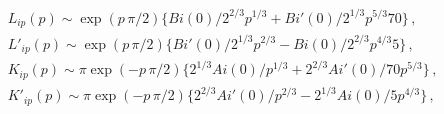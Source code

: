 \begin{equation}\label{app}\begin{array}{l} L_{ip}(p)\sim \exp(p\,\pi/2)\{Bi(0)/2^{2/3}p^{1/3}+Bi'(0)/2^{1/3}p^{5/3}70\}\,,\\
L'_{ip}(p)\sim
\exp(p\,\pi/2)\{Bi'(0)/2^{1/3}p^{2/3}-Bi(0)/2^{2/3}p^{4/3}5\}\,,\\
K_{ip}(p)\sim
\pi\exp(-p\,\pi/2)\{2^{1/3}Ai(0)/p^{1/3}+2^{2/3}Ai'(0)/70p^{5/3}\}\,,\\K'_{ip}(p)\sim
\pi\exp(-p\,\pi/2)\{2^{2/3}Ai'(0)/p^{2/3}-2^{1/3}Ai(0)/5p^{4/3}\}\,,
\end{array}\end{equation} 
